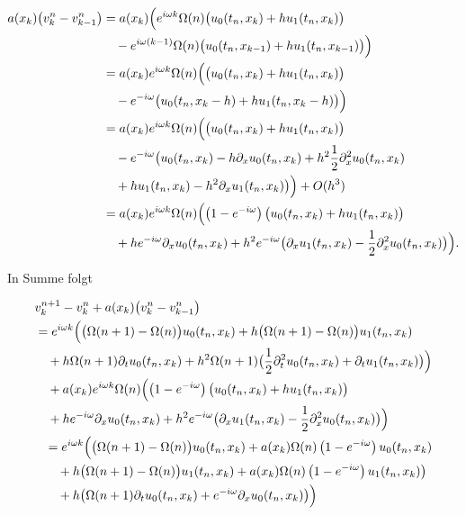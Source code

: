\begin{align}
\begin{split}
a(x_k) \bigl( v^n_k - v^n_{k-1} \bigr)
&= a(x_k) \Bigl( e^{i \omega k} \Omega(n) \bigl( u_0(t_n, x_k) + h u_1(t_n, x_k) \bigr)\\
&\quad - e^{i \omega (k-1)} \Omega(n) \bigl( u_0(t_n, x_{k-1}) + h u_1(t_n, x_{k-1}) \bigr) \Bigr)\\
&= a(x_k) e^{i \omega k} \Omega(n) \Bigl( \bigl( u_0(t_n, x_k) + h u_1(t_n, x_k) \bigr)\\
&\quad - e^{- i \omega} \bigl( u_0(t_n, x_k-h) + h u_1(t_n, x_k-h) \bigr) \Bigr)\\
&= a(x_k) e^{i \omega k} \Omega(n) \Bigl( \bigl( u_0(t_n, x_k) + h u_1(t_n, x_k) \bigr)\\
&\quad - e^{- i \omega} \bigl( u_0(t_n, x_k) - h \partial_x u_0(t_n, x_k) + h^2 \frac{1}{2} \partial^2_x u_0(t_n, x_k)\\
&\quad + h u_1(t_n, x_k) - h^2 \partial_x u_1(t_n, x_k) \bigr) \Bigr) + O(h^3)\\
&= a(x_k) e^{i \omega k} \Omega(n) \Bigl( \left(1-e^{-i \omega}\right) \bigl( u_0(t_n, x_k) + h u_1(t_n, x_k) \bigr)\\
&\quad + h e^{-i \omega} \partial_x u_0(t_n, x_k) + h^2 e^{-i \omega} \bigl( \partial_x u_1(t_n, x_k) - \frac{1}{2} \partial^2_x u_0(t_n, x_k) \bigr) \Bigr).
\end{split}
\end{align}

In Summe folgt

\begin{align}
\begin{split}
&v^{n+1}_k - v^n_k + a(x_k) \bigl( v^n_k - v^n_{k-1} \bigr)\\
&= e^{i \omega k} \Bigl( \bigl(\Omega(n+1) - \Omega(n) \bigr) u_0(t_n, x_k) + h \bigl(\Omega(n+1) - \Omega(n) \bigr) u_1(t_n, x_k)\\
&\quad + h \Omega(n+1) \partial_t u_0(t_n, x_k) + h^2 \Omega(n+1) \bigl( \frac{1}{2} \partial^2_t u_0(t_n, x_k) + \partial_t u_1(t_n, x_k) \bigr) \Bigr)\\
&\quad + a(x_k) e^{i \omega k} \Omega(n) \Bigl( \left(1-e^{-i \omega}\right) \bigl( u_0(t_n, x_k) + h u_1(t_n, x_k) \bigr)\\
&\quad + h e^{-i \omega} \partial_x u_0(t_n, x_k) + h^2 e^{-i \omega} \bigl( \partial_x u_1(t_n, x_k) - \frac{1}{2} \partial^2_x u_0(t_n, x_k) \bigr) \Bigr)\\
\end{split}\\
\begin{split}
&= e^{i \omega k} \Bigl(
\bigl(\Omega(n+1) - \Omega(n) \bigr) u_0(t_n, x_k) + a(x_k) \Omega(n) \left(1-e^{-i \omega}\right) u_0(t_n, x_k)\\
&\quad + h \bigl(\Omega(n+1) - \Omega(n) \bigr) u_1(t_n, x_k) + a(x_k) \Omega(n) \left(1-e^{-i \omega}\right) u_1(t_n, x_k) \bigr)\\
&\quad + h \bigl( \Omega(n+1) \partial_t u_0(t_n, x_k) + e^{-i \omega} \partial_x u_0(t_n, x_k) \bigr)
\Bigr)
\end{split}
\end{align}
